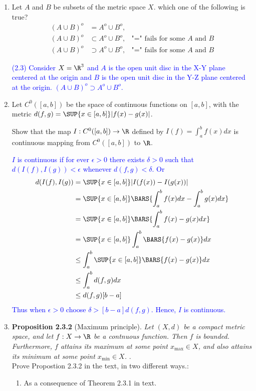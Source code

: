 \documentclass[10pt,a4paper]{report}
\newcommand{\BLUE}[1]{\textcolor{blue}{#1}}
\begin{document}
\begin{enumerate}[label=\Roman*.]
	\item Let $A$ and $B$ be subsets of the metric space $X$.  which one of the following is true?
	\begin{align}
		(A\cup B)^o &= A^o \cup B^o, &\label{eq:eq1}\tag{2.1}\\
		(A \cup B)^o &\subset A^o\cup B^o, & \text{"=" fails for some $A$ and $B$} \label{eq:eq1}\tag{2.2} \\
		(A\cup B)^o &\supset A^o\cup B^o, &\text{"=" fails for some $A$ and $B$}\label{eq:eq1}\tag{2.3}
	\end{align}
	
	\BLUE{(2.3) Consider $X = \R^3$ and $A$ is the open unit disc in the X-Y plane centered at the origin and $B$ is the open unit disc in the Y-Z plane centered at the origin.  $(A \cup B)^o \supset A^o\cup B^o$. }
	
	\item Let $C^0([a,b])$ be the space of continuous functions on $[a,b]$, with the metric $d(f,g) = \SUP{x\in [a,b]}|f(x)-g(x)|$.
	
	Show that the map $I: C^0([a,b]) \to \R$ defined by $I(f)=\int_a^b f(x) dx$ is continuous mapping from $C^0([a,b])$ to $\R$.
	
	\BLUE{$I$ is continuous if for ever $\epsilon > 0$ there exists $\delta > 0$ such that $d(I(f),I(g))<\epsilon$ whenever $d(f,g) < \delta$. Or 
	\begin{align*}
		d(I(f),I(g)) &= \SUP{x\in [a,b]}|I(f(x))-I(g(x))|\\
			&= \SUP{x\in [a,b]}\BARS{\int_a^b f(x) dx-\int_a^b g(x) dx}\\
			&= \SUP{x\in [a,b]}\BARS{\int_a^b f(x) - g(x) dx}\\
			&= \SUP{x\in [a,b]}\int_a^b \BARS{f(x) - g(x)} dx\\
			&\le \int_a^b \SUP{x\in [a,b]}\BARS{f(x) - g(x)} dx\\
			&\le \int_a^b d(f,g) dx\\
			&\le d(f,g)[b-a]
	\end{align*}Thus when $\epsilon > 0$ choose $\delta > [b-a]d(f,g)$.  Hence, $I$ is continuous.
	}
	
	\item \textbf{Proposition 2.3.2} (Maximum principle). \textit{ Let $(X,d)$ be a compact metric space, and let $f:X \to \R$ be a contnuous function.  Then $f$ is bounded.  Furthermore, $f$ attains its maximum at some point $x_{\max} \in X$, and also attains its minimum at some point $x_{\min} \in X$. }. \\
	Prove Propostion 2.3.2 in the text, in two different ways.:
	\begin{enumerate}[label=\alph*)]
		\item As a consequence of Theorem 2.3.1 in text.
		

\end{enumerate}
\end{enumerate}
\end{document}
